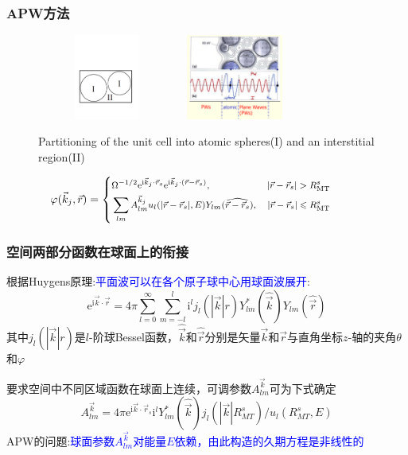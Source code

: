 \documentclass[cjk,slidestop,compress,mathserif,blue]{beamer}
\begin{document}
\frame
{
\frametitle{\textrm{APW}方法}
\begin{figure}[h!]
\centering
\includegraphics[height=1.10in,width=1.80in,viewport=40 150 545 465,clip]{Figures/Muffin_tin.pdf}
\includegraphics[height=1.10in,width=1.45in,viewport=1 20 485 435,clip]{Figures/APW.png}
\caption{\small \textrm{Partitioning of the unit cell into atomic spheres(I) and an interstitial region(II)}}%
\label{Muffin_tin-2}
\end{figure}
\begin{displaymath}
\hskip -28pt\footnotesize \varphi(\vec k_j,\vec r)=\left\{
  \begin{aligned}
	  &\Omega^{-1/2}\mathrm{e}^{\mathrm{i}\vec k_j\cdot\vec r_s}\mathrm{e}^{\mathrm{i}\vec k_j\cdot(\vec r-\vec r_s)},&|\vec r-\vec r_s|>R_{\mathrm{MT}}^s\\
	  &\sum_{lm}A_{lm}^{\vec k_j}u_l(|\vec r-\vec r_s|,E)Y_{lm}(\widehat{\vec r-\vec r_s}),&|\vec r-\vec r_s|\leqslant R_{\mathrm{MT}}^s
  \end{aligned}
\right.
\end{displaymath}
}

\frame
{
	\frametitle{空间两部分函数在球面上的衔接}
	根据\textrm{Huygens}原理:\textcolor{blue}{平面波可以在各个原子球中心用球面波展开}:
	\begin{displaymath}
		\mathrm{e}^{\mathrm{i}\vec k\cdot\vec r}=4\pi\sum_{l=0}^{\infty}\sum_{m=-l}^l\mathrm{i}^lj_l(|\vec k|r)Y_{lm}^{\ast}(\hat{\vec k})Y_{lm}(\hat{\vec r})
	\end{displaymath}
	其中$j_l(|\vec k|r)$是$l$-阶球\textrm{Bessel}函数，$\hat{\vec k}$和$\hat{\vec r}$分别是矢量$\vec k$和$\vec r$与直角坐标$z$-轴的夹角$\theta$和$\varphi$

	要求空间中不同区域函数在球面上连续，可调参数$A_{lm}^{\vec k}$可为下式确定
\begin{displaymath}
	A_{lm}^{\vec k}=4\pi\mathrm{e}^{\mathrm{i}\vec k\cdot\vec r_s}\mathrm{i}^lY_{lm}^{\ast}(\hat{\vec k})j_l(|\vec k|R_{MT}^s)/u_l(R_{MT}^s,E)
\end{displaymath}
\textrm{APW}的问题:\textcolor{blue}{球面参数$A_{lm}^{\vec k}$对能量$E$依赖，由此构造的久期方程是非线性的}
}
\end{document}
